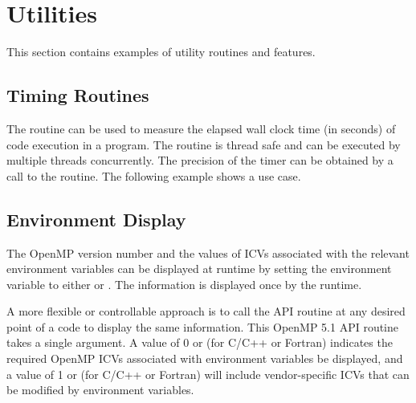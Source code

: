 \pagebreak
\section{Utilities}
\label{sec:utilities}
This section contains examples of utility routines and features.

\subsection{Timing Routines}
\label{subsec:get_wtime}

The  routine can be used to measure the elapsed wall
clock time (in seconds) of code execution in a program.
The routine is thread safe and can be executed by multiple threads concurrently.
The precision of the timer can be obtained by a call to
the  routine. The following example shows a use case.




\subsection{Environment Display}
\label{subsec:display_env}

The OpenMP version number and the values of ICVs associated with the relevant
environment variables can be displayed at runtime by setting 
the  environment variable to either 
 or .
The information is displayed once by the runtime.

A more flexible or controllable approach is to call 
the  API routine at any desired
point of a code to display the same information.
This OpenMP 5.1 API routine takes a single  argument.
A value of 0 or  (for C/C++ or Fortran) indicates
the required OpenMP ICVs associated with environment variables be displayed,
and a value of 1 or  (for C/C++ or Fortran) will include
vendor-specific ICVs that can be modified by environment variables.

